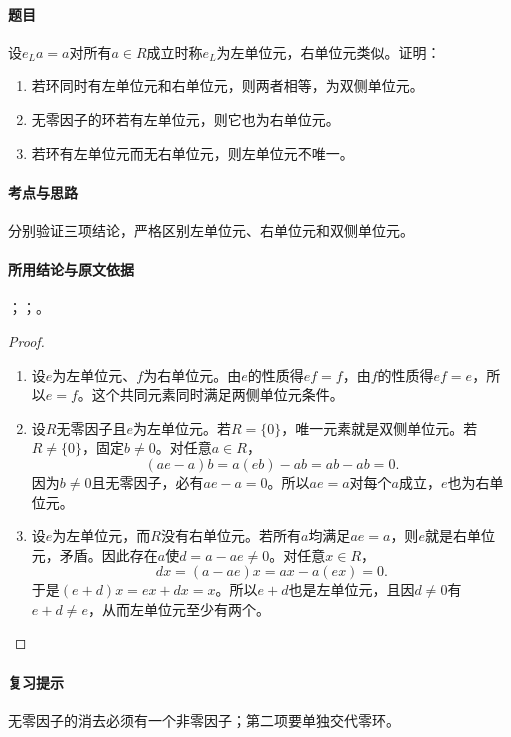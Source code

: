 \paragraph{题目}
设$e_La=a$对所有$a\in R$成立时称$e_L$为左单位元，右单位元类似。证明：
\begin{enumerate}
\item 若环同时有左单位元和右单位元，则两者相等，为双侧单位元。
\item 无零因子的环若有左单位元，则它也为右单位元。
\item 若环有左单位元而无右单位元，则左单位元不唯一。
\end{enumerate}

\paragraph{考点与思路}
分别验证三项结论，严格区别左单位元、右单位元和双侧单位元。

\paragraph{所用结论与原文依据}
；；。


\begin{proof}
\begin{enumerate}
\item 设$e$为左单位元、$f$为右单位元。由$e$的性质得$ef=f$，由$f$的性质得$ef=e$，所以$e=f$。这个共同元素同时满足两侧单位元条件。

\item 设$R$无零因子且$e$为左单位元。若$R=\{0\}$，唯一元素就是双侧单位元。若$R\ne\{0\}$，固定$b\ne0$。对任意$a\in R$，
\[
(ae-a)b=a(eb)-ab=ab-ab=0.
\]
因为$b\ne0$且无零因子，必有$ae-a=0$。所以$ae=a$对每个$a$成立，$e$也为右单位元。

\item 设$e$为左单位元，而$R$没有右单位元。若所有$a$均满足$ae=a$，则$e$就是右单位元，矛盾。因此存在$a$使$d=a-ae\ne0$。对任意$x\in R$，
\[
dx=(a-ae)x=ax-a(ex)=0.
\]
于是$(e+d)x=ex+dx=x$。所以$e+d$也是左单位元，且因$d\ne0$有$e+d\ne e$，从而左单位元至少有两个。
\end{enumerate}
\end{proof}

\paragraph{复习提示}
无零因子的消去必须有一个非零因子；第二项要单独交代零环。


